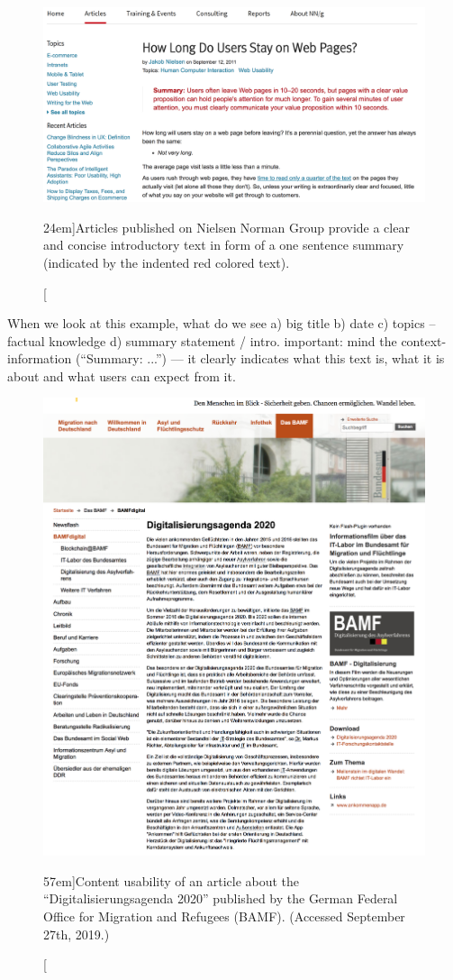 \begin{figure}%
  \includegraphics[width=1.50\textwidth]{../figures/good_intro_nngroup.png}
  \caption[][24em]{Articles published on Nielsen Norman Group provide a clear and concise introductory text in form of a one sentence summary (indicated by the indented red colored text). }
  \label{fig:content_usability_nng}
\end{figure}

When we look at this example, what do we see
a) big title
b) date
c) topics -- factual knowledge
d) summary statement / intro. important: mind the context-information (``Summary: ...'') --- it clearly indicates what this text is, what it is about and what users can expect from it.

\begin{figure}%
  \includegraphics[width=1.54\textwidth]{../figures/content_usability_bamf.png}
  \caption[][57em]{Content usability of an article about the ``Digitalisierungsagenda 2020'' published by the German Federal Office for Migration and Refugees (BAMF). (Accessed September 27th, 2019.) }
  \label{fig:content_usability_bamf}
\end{figure}

